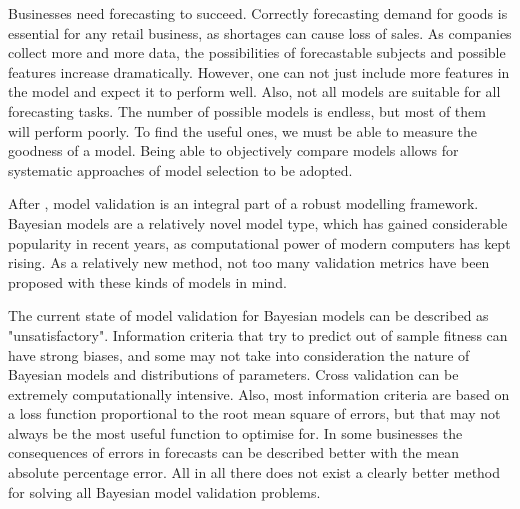 \documentclass[english, 12pt, a4paper, sci, utf8, a-1b, online]{aaltothesis}
\begin{document}






Businesses need forecasting to succeed. Correctly forecasting demand for goods is essential for any retail business, as shortages can cause loss of sales. As companies collect more and more data, the possibilities of forecastable subjects and possible features increase dramatically. However, one can not just include more features in the model and expect it to perform well. Also, not all models are suitable for all forecasting tasks. The number of possible models is endless, but most of them will perform poorly. To find the useful ones, we must be able to measure the goodness of a model. Being able to objectively compare models allows for systematic approaches of model selection to be adopted.

After \cite{BDA}, model validation is an integral part of a robust modelling framework. Bayesian models are a relatively novel model type, which has gained considerable popularity in recent years, as computational power of modern computers has kept rising. As a relatively new method, not too many validation metrics have been proposed with these kinds of models in mind.

The current state of model validation for Bayesian models can be described as "unsatisfactory". Information criteria that try to predict out of sample fitness can have strong biases, and some may not take into consideration the nature of Bayesian models and distributions of parameters. Cross validation can be extremely computationally intensive. Also, most information criteria are based on a loss function proportional to the root mean square of errors, but that may not always be the most useful function to optimise for. In some businesses the consequences of errors in forecasts can be described better with the mean absolute percentage error. All in all there does not exist a clearly better method for solving all Bayesian model validation problems.
\end{document}
